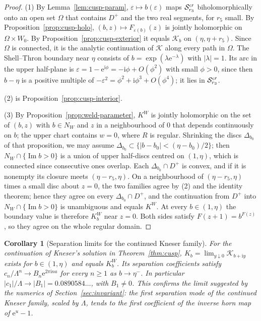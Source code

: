 \documentclass[11pt]{amsart}
\newtheorem{corollary}[theorem]{Corollary}
\theoremstyle{definition}
\newcommand{\Rr}{R}
\newcommand{\Kk}{K}
\newcommand{\eee}{\mathrm{e}}
\newcommand{\ii}{\mathrm{i}}
\begin{document}
\begin{proof}
(1) By Lemma~\ref{lem:cusp-param}, $\varepsilon\mapsto b(\varepsilon)$ maps $\mathcal S^{\rm c\prime}_{r_3}$
biholomorphically onto an open set $\Omega$ that contains $D^+$ and the two real
segments, for $r_5$ small.  By Proposition~\ref{prop:cusp-holo},
$(b,z)\mapsto F_{\varepsilon(b)}(z)$ is jointly holomorphic on $\Omega\times W_0$.  By
Proposition~\ref{prop:cusp-exterior} it equals $\mathcal K_b$ on $(\eta,\eta+r_5)$.  Since
$\Omega$ is connected, it is the analytic continuation of $\mathcal K$ along every path
in $\Omega$.  The Shell--Thron boundary near $\eta$ consists of
$b=\exp(\lambda\eee^{-\lambda})$ with $|\lambda|=1$.  Its arc in the upper half-plane is
$\varepsilon=1-\eee^{\ii\phi}=-\ii\phi+O(\phi^2)$ with small $\phi>0$, since then
$b-\eta$ is a positive multiple of $-\varepsilon^2=\phi^2+\ii\phi^3+O(\phi^4)$; it lies in
$\mathcal S^{\rm c\prime}_{r_3}$.

(2) is Proposition~\ref{prop:cusp-interior}.

(3) By Proposition~\ref{prop:weld-parameter}, $\Kk^W$ is jointly holomorphic on
the set of $(b,z)$ with $b\in N_W$ and $z$ in a neighbourhood of $0$ that
depends continuously on $b$; the upper chart contains $w=0$, where $\Rr$ is
regular.  Shrinking the discs $\Delta_{b_0}$ of that proposition, we may assume
$\Delta_{b_0}\subset\{|b-b_0|<(\eta-b_0)/2\}$; then $N_W\cap\{\operatorname{Im}b>0\}$ is a union
of upper half-discs centred on $(1,\eta)$, which is connected since
consecutive ones overlap.  Each $\Delta_{b_0}\cap D^+$ is convex, and if it is
nonempty its closure meets $(\eta-r_5,\eta)$.  On a neighbourhood of
$(\eta-r_5,\eta)$ times a small disc about $z=0$, the two families agree by (2)
and the identity theorem; hence they agree on every $\Delta_{b_0}\cap D^+$, and the
continuation from $D^+$ into $N_W\cap\{\operatorname{Im}b>0\}$ is unambiguous and equals
$\Kk^W$.  At every $b\in(1,\eta)$ the boundary value is therefore $\Kk^W_b$ near
$z=0$.  Both sides satisfy
$F(z+1)=b^{F(z)}$, so they agree on the whole regular domain.
\end{proof}

\begin{corollary}[Separation limits for the continued Kneser family]\label{cor:conjecture}
For the continuation of Kneser's solution in Theorem~\ref{thm:cusp},
$\Kk_b=\lim_{y\downarrow0}\mathcal K_{b+\ii y}$ exists for $b\in(1,\eta)$ and equals $\Kk^W_b$.  Its
separation coefficients satisfy $c_n/\Lambda^n\to B_n\eee^{2\pi\ii na}$ for every $n\ge1$
as $b\to\eta^-$.  In particular $|c_1|/\Lambda\to|B_1|=0.0890584\ldots$, with $B_1\ne0$.
This confirms the limit suggested by the numerics of Section~\ref{sec:invariant}:
the first separation mode of the continued Kneser family, scaled by $\Lambda$,
tends to the first coefficient of the inverse horn map of $\eee^u-1$.
\end{corollary}
\end{document}
